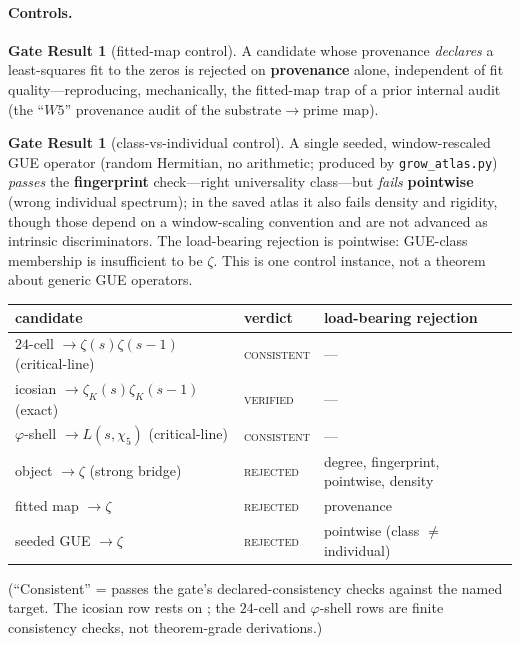 \documentclass[11pt]{article}
\theoremstyle{definition}
\newtheorem{result}[theorem]{Gate Result}
\newcommand{\zetaK}{\zeta_{K}}
\begin{document}
\paragraph{Controls.}
\begin{result}[fitted-map control]\label{res:fit}
A candidate whose provenance \emph{declares} a least-squares fit to the zeros is rejected
on \textbf{provenance} alone, independent of fit quality---reproducing, mechanically, the
fitted-map trap of a prior internal audit (the ``$W5$'' provenance audit of the
substrate$\to$prime map).
\end{result}
\begin{result}[class-vs-individual control]\label{res:gue}
A single seeded, window-rescaled GUE operator (random Hermitian, no arithmetic; produced
by \texttt{grow\_atlas.py}) \emph{passes} the \textbf{fingerprint} check---right
universality class---but \emph{fails} \textbf{pointwise} (wrong individual spectrum); in
the saved atlas it also fails density and rigidity, though those depend on a window-scaling
convention and are not advanced as intrinsic discriminators. The load-bearing rejection is
pointwise: GUE-class membership is insufficient to be $\zeta$. This is one control instance,
not a theorem about generic GUE operators.
\end{result}

\begin{center}\small
\begin{tabular}{llp{4.2cm}}
\hline
candidate & verdict & load-bearing rejection \\
\hline
$24$-cell $\to \zeta(s)\zeta(s-1)$ (critical-line) & \textsc{consistent} & --- \\
icosian $\to \zetaK(s)\zetaK(s-1)$ (exact) & \textsc{verified} & --- \\
$\varphi$-shell $\to L(s,\chi_5)$ (critical-line) & \textsc{consistent} & --- \\
object $\to \zeta$ (strong bridge) & \textsc{rejected} & degree, fingerprint, pointwise, density \\
fitted map $\to \zeta$ & \textsc{rejected} & provenance \\
seeded GUE $\to \zeta$ & \textsc{rejected} & pointwise (class $\ne$ individual) \\
\hline
\end{tabular}
\end{center}
\noindent (``Consistent'' = passes the gate's declared-consistency checks against the
named target. The icosian row rests on \cite{IcosianTriad}; the $24$-cell and
$\varphi$-shell rows are finite consistency checks, not theorem-grade derivations.)
\end{document}
